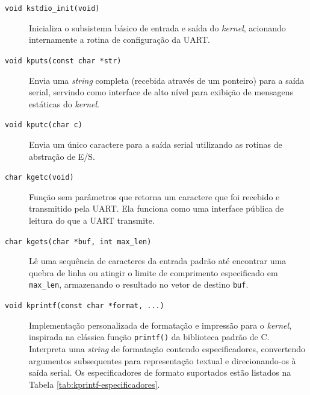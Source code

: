 \begin{description}
    \item[\texttt{void kstdio\_init(void)}]
    Inicializa o subsistema básico de entrada e saída do \textit{kernel}, acionando internamente a rotina de configuração da UART.

    \item[\texttt{void kputs(const char *str)}]
    Envia uma \textit{string} completa (recebida através de um ponteiro) para a saída serial, servindo como interface de alto nível para exibição de mensagens estáticas do \textit{kernel}.

    \item[\texttt{void kputc(char c)}]
    Envia um único caractere para a saída serial utilizando as rotinas de abstração de E/S.

    \item[\texttt{char kgetc(void)}]
    Função sem parâmetros que retorna um caractere que foi recebido e transmitido pela UART. Ela funciona como uma interface pública de leitura do que a UART transmite.

    \item[\texttt{char kgets(char *buf, int max\_len)}]
    Lê uma sequência de caracteres da entrada padrão até encontrar uma quebra de linha ou atingir o limite de comprimento especificado em \texttt{max\_len}, armazenando o resultado no vetor de destino \texttt{buf}.

    \item[\texttt{void kprintf(const char *format, ...)}]
    Implementação personalizada de formatação e impressão para o \textit{kernel}, inspirada na clássica função \texttt{printf()} da biblioteca padrão de C. Interpreta uma \textit{string} de formatação contendo especificadores, convertendo argumentos subsequentes para representação textual e direcionando-os à saída serial. Os especificadores de formato suportados estão listados na Tabela \ref{tab:kprintf-especificadores}.
\end{description}

